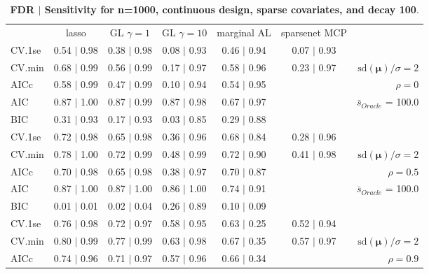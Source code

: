 \clearpage
\begin{table}\vspace{-.5cm}
\caption[l]{ {\it }
{ \bf FDR $\boldsymbol{\mid}$ Sensitivity for n=1000, continuous design, sparse covariates, and  decay  100}.}
\vspace{-.5cm}
\footnotesize{}
\begin{center}
\begin{tabular}{l*{5}{c}|r}
 & lasso & GL $\gamma=1$ & GL $\gamma=10$ & marginal AL & sparsenet MCP  & \\
 \cline{1-7}
CV.1se & 0.54 $\mid$ 0.98 & 0.38 $\mid$ 0.98 & 0.08 $\mid$ 0.93 & 0.46 $\mid$ 0.94 & 0.07 $\mid$ 0.93 & \\
CV.min & 0.68 $\mid$ 0.99 & 0.56 $\mid$ 0.99 & 0.17 $\mid$ 0.97 & 0.58 $\mid$ 0.96 & 0.23 $\mid$ 0.97 &  $\mathrm{sd}(\mathbf{\mu})/\sigma=2$ \\
AICc & 0.58 $\mid$ 0.99 & 0.47 $\mid$ 0.99 & 0.10 $\mid$ 0.94 & 0.54 $\mid$ 0.95 & & $\rho=0$ \\
AIC & 0.87 $\mid$ 1.00 & 0.87 $\mid$ 0.99 & 0.87 $\mid$ 0.98 & 0.67 $\mid$ 0.97 & &  \multirow{2}{*}{$\bar{s}_{Oracle}$ = 100.0} \\
BIC & 0.31 $\mid$ 0.93 & 0.17 $\mid$ 0.93 & 0.03 $\mid$ 0.85 & 0.29 $\mid$ 0.88 & &  \\
 \hline 
CV.1se & 0.72 $\mid$ 0.98 & 0.65 $\mid$ 0.98 & 0.36 $\mid$ 0.96 & 0.68 $\mid$ 0.84 & 0.28 $\mid$ 0.96 & \\
CV.min & 0.78 $\mid$ 1.00 & 0.72 $\mid$ 0.99 & 0.48 $\mid$ 0.99 & 0.72 $\mid$ 0.90 & 0.41 $\mid$ 0.98 &  $\mathrm{sd}(\mathbf{\mu})/\sigma=2$ \\
AICc & 0.70 $\mid$ 0.98 & 0.65 $\mid$ 0.98 & 0.38 $\mid$ 0.97 & 0.70 $\mid$ 0.87 & & $\rho=0.5$ \\
AIC & 0.87 $\mid$ 1.00 & 0.87 $\mid$ 1.00 & 0.86 $\mid$ 1.00 & 0.74 $\mid$ 0.91 & &  \multirow{2}{*}{$\bar{s}_{Oracle}$ = 100.0} \\
BIC & 0.01 $\mid$ 0.01 & 0.02 $\mid$ 0.04 & 0.26 $\mid$ 0.89 & 0.10 $\mid$ 0.09 & &  \\
 \hline 
CV.1se & 0.76 $\mid$ 0.98 & 0.72 $\mid$ 0.97 & 0.58 $\mid$ 0.95 & 0.63 $\mid$ 0.25 & 0.52 $\mid$ 0.94 & \\
CV.min & 0.80 $\mid$ 0.99 & 0.77 $\mid$ 0.99 & 0.63 $\mid$ 0.98 & 0.67 $\mid$ 0.35 & 0.57 $\mid$ 0.97 &  $\mathrm{sd}(\mathbf{\mu})/\sigma=2$ \\
AICc & 0.74 $\mid$ 0.96 & 0.71 $\mid$ 0.97 & 0.57 $\mid$ 0.96 & 0.66 $\mid$ 0.34 & & $\rho=0.9$ \\

\end{tabular}
\end{center}
\end{table}

